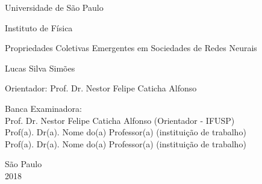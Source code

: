 \clearpage



\newpage\null\thispagestyle{empty}\newpage




\pagestyle{empty}

\begin{center}
{\fontsize{16}{16} \selectfont Universidade de São Paulo \\}

\vspace{0.1cm}

{\fontsize{16}{16} \selectfont Instituto de Física}

\vspace{3.3cm}

{\fontsize{22}{22}\selectfont Propriedades Coletivas Emergentes em Sociedades de Redes Neurais \par}

\vspace{2cm}

{\fontsize{18}{18}\selectfont Lucas Silva Simões \par}

\vspace{2cm}

\end{center}

\leftskip 4cm

\begin{flushright}
\leftskip 4cm
Orientador: Prof. Dr.  Nestor Felipe Caticha Alfonso
\end{flushright}

\vspace{0.5cm}

\par
\leftskip 4cm

\par

\leftskip 0cm

\vskip 1.2cm

\noindent Banca Examinadora: \\
\noindent Prof. Dr. Nestor Felipe Caticha Alfonso (Orientador - IFUSP) \\
Prof(a). Dr(a). Nome do(a) Professor(a) (instituição de trabalho) \\
Prof(a). Dr(a). Nome do(a) Professor(a) (instituição de trabalho) \\
\vspace{1.2cm}

\begin{center}
	São Paulo \\ 2018
\end{center}

\clearpage


\newpage\null\thispagestyle{empty}\newpage

